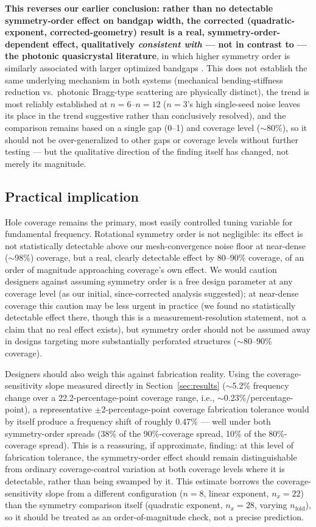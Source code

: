 \documentclass[11pt]{article}
\begin{document}
\textbf{This reverses our earlier conclusion: rather than no detectable symmetry-order effect on bandgap width, the corrected (quadratic-exponent, corrected-geometry) result is a real, symmetry-order-dependent effect, qualitatively \textit{consistent with} --- not in contrast to --- the photonic quasicrystal literature}, in which higher symmetry order is similarly associated with larger optimized bandgaps \cite{florescu2009}. This does not establish the same underlying mechanism in both systems (mechanical bending-stiffness reduction vs.\ photonic Bragg-type scattering are physically distinct), the trend is most reliably established at $n=6$--$n=12$ ($n=3$'s high single-seed noise leaves its place in the trend suggestive rather than conclusively resolved), and the comparison remains based on a single gap (0--1) and coverage level ($\sim$80\%), so it should not be over-generalized to other gaps or coverage levels without further testing --- but the qualitative direction of the finding itself has changed, not merely its magnitude.

\subsection{Practical implication}

Hole coverage remains the primary, most easily controlled tuning variable for fundamental frequency. Rotational symmetry order is not negligible: its effect is not statistically detectable above our mesh-convergence noise floor at near-dense ($\sim$98\%) coverage, but a real, clearly detectable effect by 80--90\% coverage, of an order of magnitude approaching coverage's own effect. We would caution designers against assuming symmetry order is a free design parameter at any coverage level (as our initial, since-corrected analysis suggested); at near-dense coverage this caution may be less urgent in practice (we found no statistically detectable effect there, though this is a measurement-resolution statement, not a claim that no real effect exists), but symmetry order should not be assumed away in designs targeting more substantially perforated structures ($\sim$80--90\% coverage).

Designers should also weigh this against fabrication reality. Using the coverage-sensitivity slope measured directly in Section~\ref{sec:results} ($\sim$5.2\% frequency change over a 22.2-percentage-point coverage range, i.e., $\sim$0.23\%/percentage-point), a representative $\pm$2-percentage-point coverage fabrication tolerance would by itself produce a frequency shift of roughly 0.47\% --- well under both symmetry-order spreads (38\% of the 90\%-coverage spread, 10\% of the 80\%-coverage spread). This is a reassuring, if approximate, finding: at this level of fabrication tolerance, the symmetry-order effect should remain distinguishable from ordinary coverage-control variation at both coverage levels where it is detectable, rather than being swamped by it. This estimate borrows the coverage-sensitivity slope from a different configuration ($n=8$, linear exponent, $n_x=22$) than the symmetry comparison itself (quadratic exponent, $n_x=28$, varying $n_{\text{fold}}$), so it should be treated as an order-of-magnitude check, not a precise prediction.
\end{document}
